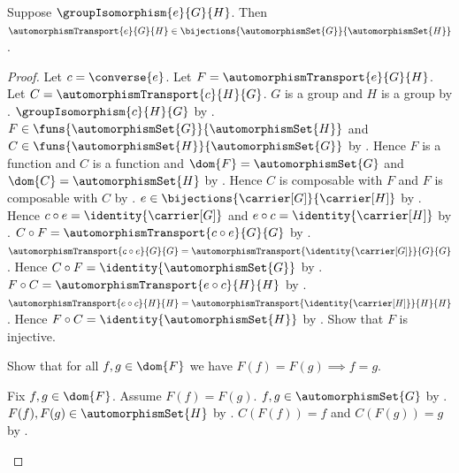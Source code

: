 \begin{theorem}\label{automorphism_transport_bijection}
    Suppose $\groupIsomorphism{e}{G}{H}$.
    Then $\automorphismTransport{e}{G}{H}\in
        \bijections{\automorphismSet{G}}{\automorphismSet{H}}$.
\end{theorem}
\begin{proof}
    Let $c=\converse{e}$.
    Let $F=\automorphismTransport{e}{G}{H}$.
    Let $C=\automorphismTransport{c}{H}{G}$.
    $G$ is a group and $H$ is a group by
        .
    $\groupIsomorphism{c}{H}{G}$ by
        .
    $F\in\funs{\automorphismSet{G}}{\automorphismSet{H}}$ and
        $C\in\funs{\automorphismSet{H}}{\automorphismSet{G}}$ by
        .
    Hence $F$ is a function and $C$ is a function and
        $\dom{F}=\automorphismSet{G}$ and
        $\dom{C}=\automorphismSet{H}$ by
        .
    Hence $C$ is composable with $F$ and
        $F$ is composable with $C$ by
        .
    $e\in\bijections{\carrier[G]}{\carrier[H]}$ by
        .
    Hence $c\circ e=\identity{\carrier[G]}$ and
        $e\circ c=\identity{\carrier[H]}$ by
        .
    $C\circ F=\automorphismTransport{c\circ e}{G}{G}$ by
        .
    $\automorphismTransport{c\circ e}{G}{G}=
        \automorphismTransport{\identity{\carrier[G]}}{G}{G}$.
    Hence $C\circ F=\identity{\automorphismSet{G}}$ by
        .
    $F\circ C=\automorphismTransport{e\circ c}{H}{H}$ by
        .
    $\automorphismTransport{e\circ c}{H}{H}=
        \automorphismTransport{\identity{\carrier[H]}}{H}{H}$.
    Hence $F\circ C=\identity{\automorphismSet{H}}$ by
        .
    Show that $F$ is injective.
    \begin{subproof}
        Show that for all $f,g\in\dom{F}$ we have
            $F(f)=F(g)\implies f=g$.
        \begin{subproof}
            Fix $f,g\in\dom{F}$.
            Assume $F(f)=F(g)$.
            $f,g\in\automorphismSet{G}$ by .
            $F(f),F(g)\in\automorphismSet{H}$ by
                .
            $C(F(f))=f$ and $C(F(g))=g$ by
                .
        \end{subproof}

\end{subproof}
\end{proof}

